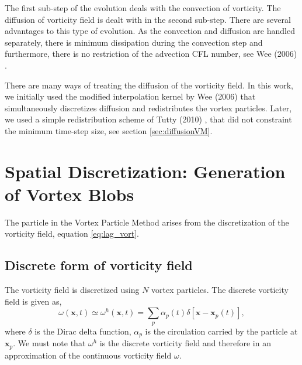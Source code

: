 The first sub-step of the evolution deals with the convection of vorticity. The diffusion of vorticity field is dealt with in the second sub-step. There are several advantages to this type of evolution. As the convection and diffusion are handled separately, there is minimum dissipation during the convection step and furthermore, there is no restriction of the advection CFL number, see Wee (2006) \cite{Wee2006a}.

There are many ways of treating the diffusion of the vorticity field. In this work, we initially used the modified interpolation kernel by Wee (2006) \cite{Wee2006a} that simultaneously discretizes diffusion and redistributes the vortex particles. Later, we used a simple redistribution scheme of Tutty (2010) \cite{Tutty2010a}, that did not constraint the minimum time-step size, see section \ref{sec:diffusionVM}.

\section{Spatial Discretization: Generation of Vortex Blobs}
\label{sec:spatialDiscretization}

The particle in the Vortex Particle Method arises from the discretization of the vorticity field, equation \ref{eq:lag_vort}. 

\subsection{Discrete form of vorticity field}
\label{subsec:discreteVorticity}
The vorticity field is discretized using $N$ vortex particles. The discrete vorticity field is given as,
	\begin{equation}
	\omega\left(\mathbf{x},t\right) \simeq \omega^h\left(\mathbf{x},t\right) = \sum_{p}\alpha_p\left(t\right)\delta \left[\mathbf{x}-\mathbf{x}_p\left(t\right)\right],
	\end{equation}
where $\delta$ is the Dirac delta function, $\alpha_{p}$ is the circulation carried by the particle at $\mathbf{x}_p$. We must note that $\omega^h$ is the discrete vorticity field and therefore in an approximation of the continuous vorticity field $\omega$. 

